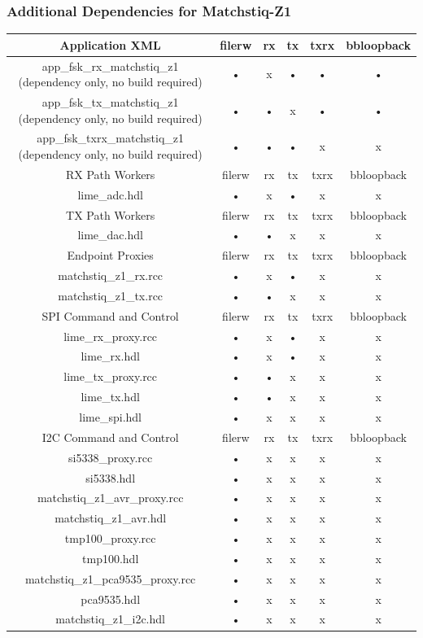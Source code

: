 \subsubsection{Additional Dependencies for Matchstiq-Z1}
	\begin{tabular}{|c|c|c|c|c|c|}
	\hline
	\rowcolor{blue}
	Application XML & filerw & rx & tx & txrx & bbloopback \\
	\hline
	app\_fsk\_rx\_matchstiq\_z1 (dependency only, no build required) & • & x & • & • & • \\
	\hline
	app\_fsk\_tx\_matchstiq\_z1 (dependency only, no build required) & • & • & x & • & • \\
	\hline
	app\_fsk\_txrx\_matchstiq\_z1 (dependency only, no build required) & • & • & • & x & x \\
	\hline
	\rowcolor{blue}
	RX Path Workers & filerw & rx & tx & txrx & bbloopback \\
	\hline
	lime\_adc.hdl & • & x & • & x & x \\
	\hline
	\rowcolor{blue}
	TX Path Workers & filerw & rx & tx & txrx & bbloopback \\
	\hline
	lime\_dac.hdl & • & • & x & x & x \\
	\hline
	\rowcolor{blue}
	Endpoint Proxies & filerw & rx & tx & txrx & bbloopback \\
	\hline
	matchstiq\_z1\_rx.rcc & • & x & • & x & x \\
	\hline
	matchstiq\_z1\_tx.rcc & • & • & x & x & x \\
	\hline
	\rowcolor{blue}
	SPI Command and Control & filerw & rx & tx & txrx & bbloopback \\
	\hline
	lime\_rx\_proxy.rcc & • & x & • & x & x \\
	\hline
	lime\_rx.hdl & • & x & • & x & x \\
	\hline
	lime\_tx\_proxy.rcc & • & • & x & x & x \\
	\hline
	lime\_tx.hdl & • & • & x & x & x \\
	\hline
	lime\_spi.hdl & • & x & x & x & x \\
	\hline
	\rowcolor{blue}
	I2C Command and Control & filerw & rx & tx & txrx & bbloopback \\
	\hline
	si5338\_proxy.rcc & • & x & x & x & x \\
	\hline
	si5338.hdl & • & x & x & x & x \\
	\hline
	matchstiq\_z1\_avr\_proxy.rcc & • & x & x & x & x \\
	\hline
	matchstiq\_z1\_avr.hdl & • & x & x & x & x \\
	\hline
	tmp100\_proxy.rcc & • & x & x & x & x \\
	\hline
	tmp100.hdl & • & x & x & x & x \\
	\hline
	matchstiq\_z1\_pca9535\_proxy.rcc & • & x & x & x & x \\
	\hline
	pca9535.hdl & • & x & x & x & x \\
	\hline
	matchstiq\_z1\_i2c.hdl & • & x & x & x & x \\
	\hline
	\end{tabular}

